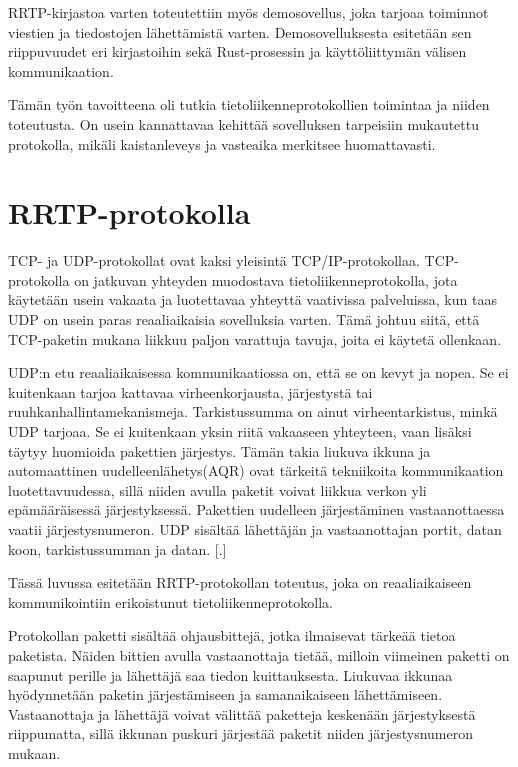 \documentclass[a4paper,12pt]{article}
\begin{document}
    RRTP-kirjastoa varten toteutettiin myös demosovellus, joka tarjoaa 
    toiminnot viestien ja tiedostojen lähettämistä varten. Demosovelluksesta esitetään sen riippuvuudet eri kirjastoihin sekä Rust-prosessin ja 
    käyttöliittymän välisen kommunikaation. \par

    Tämän työn tavoitteena oli tutkia tietoliikenneprotokollien toimintaa ja niiden toteutusta. On usein kannattavaa kehittää sovelluksen tarpeisiin mukautettu protokolla, mikäli kaistanleveys ja vasteaika merkitsee huomattavasti.

   \section{RRTP-protokolla}\label{sec:protocol}
    TCP- ja UDP-protokollat ovat kaksi yleisintä TCP/IP-protokollaa. TCP-protokolla on jatkuvan yhteyden muodostava tietoliikenneprotokolla, jota käytetään usein vakaata ja luotettavaa yhteyttä vaativissa palveluissa, kun taas UDP on usein paras reaaliaikaisia sovelluksia varten. Tämä johtuu siitä, että TCP-paketin mukana liikkuu paljon varattuja tavuja, joita ei käytetä ollenkaan.\par
    
    UDP:n etu reaaliaikaisessa kommunikaatiossa on, että se on kevyt ja nopea. Se ei kuitenkaan tarjoa kattavaa virheenkorjausta, järjestystä tai ruuhkanhallintamekanismeja. Tarkistussumma on ainut virheentarkistus, minkä UDP tarjoaa. Se ei kuitenkaan yksin riitä vakaaseen yhteyteen, vaan lisäksi täytyy huomioida pakettien järjestys. Tämän takia liukuva ikkuna ja automaattinen uudelleenlähetys(AQR) ovat tärkeitä tekniikoita kommunikaation luotettavuudessa, sillä niiden avulla paketit voivat liikkua verkon yli epämääräisessä järjestyksessä. Pakettien uudelleen järjestäminen vastaanottaessa vaatii järjestysnumeron. UDP sisältää
    lähettäjän ja vastaanottajan portit, datan koon, tarkistussumman ja datan.
    [.]
    \par
   
    Tässä luvussa esitetään RRTP-protokollan toteutus, joka on reaaliaikaiseen kommunikointiin erikoistunut tietoliikenneprotokolla.\par

    Protokollan paketti sisältää ohjausbittejä, jotka ilmaisevat tärkeää tietoa paketista. Näiden bittien avulla vastaanottaja tietää, milloin viimeinen paketti on saapunut perille ja lähettäjä saa tiedon kuittauksesta. 
    Liukuvaa ikkunaa hyödynnetään paketin järjestämiseen ja samanaikaiseen lähettämiseen.
    Vastaanottaja ja lähettäjä voivat välittää paketteja keskenään järjestyksestä riippumatta, sillä ikkunan puskuri järjestää paketit niiden järjestysnumeron mukaan.
\end{document}
